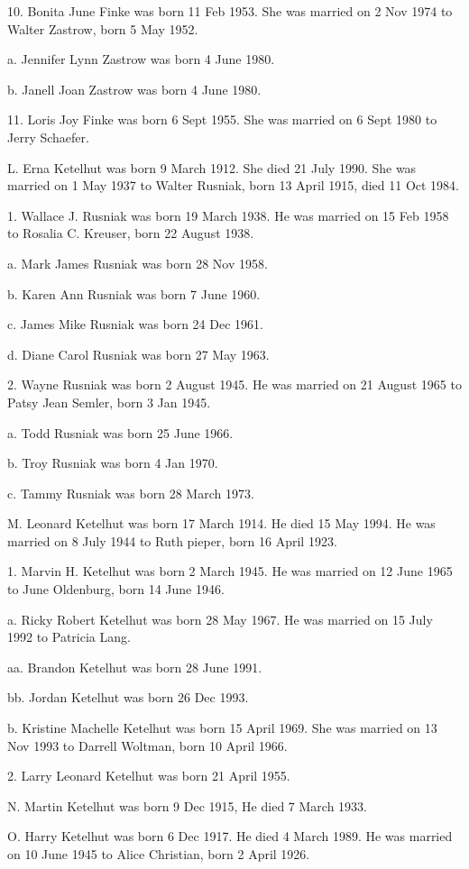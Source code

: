 \documentclass[a4paper]{article}
\begin{document}
10.  Bonita June Finke was born 11 Feb 1953.  She was married on 2 Nov 1974 to Walter Zastrow, born 5 May 1952.

a. Jennifer Lynn Zastrow was born 4 June 1980.

b. Janell Joan Zastrow was born 4 June 1980.

11. Loris Joy Finke was born 6 Sept 1955.  She was married on 6 Sept 1980 to Jerry Schaefer.

L. Erna Ketelhut was born 9 March 1912.  She died 21 July 1990.  She was married on 1 May 1937 to Walter Rusniak, born 13 April 1915, died 11 Oct 1984.

1. Wallace J. Rusniak was born 19 March 1938.  He was married on 15 Feb 1958 to Rosalia C. Kreuser, born 22 August 1938.

a. Mark James Rusniak was born 28 Nov 1958.

b. Karen Ann Rusniak was born 7 June 1960.

c. James Mike Rusniak was born 24 Dec 1961.

d. Diane Carol Rusniak was born 27 May 1963.

2. Wayne Rusniak was born 2 August 1945.  He was married on 21 August 1965 to Patsy Jean Semler, born 3 Jan 1945.

a. Todd Rusniak was born 25 June 1966.  

b. Troy Rusniak was born 4 Jan 1970.

c. Tammy Rusniak was born 28 March 1973.

M. Leonard Ketelhut was born 17 March 1914.  He died 15 May 1994.  He was married on 8 July 1944 to Ruth pieper, born 16 April 1923.  

1. Marvin H. Ketelhut was born 2 March 1945.  He was married on 12 June 1965 to June Oldenburg, born 14 June 1946.  

a. Ricky Robert Ketelhut was born 28 May 1967.  He was married on 15 July 1992 to Patricia Lang.

aa. Brandon Ketelhut was born 28 June 1991.

bb. Jordan Ketelhut was born 26 Dec 1993.

b. Kristine Machelle Ketelhut was born 15 April 1969.  She was married on 13 Nov 1993 to Darrell Woltman, born 10 April 1966.

2. Larry Leonard Ketelhut was born 21 April 1955.

N. Martin Ketelhut was born 9 Dec 1915,  He died 7 March 1933.

O. Harry Ketelhut was born 6 Dec 1917.  He died 4 March 1989.  He was married on 10 June 1945 to Alice Christian, born 2 April 1926.
\end{document}
